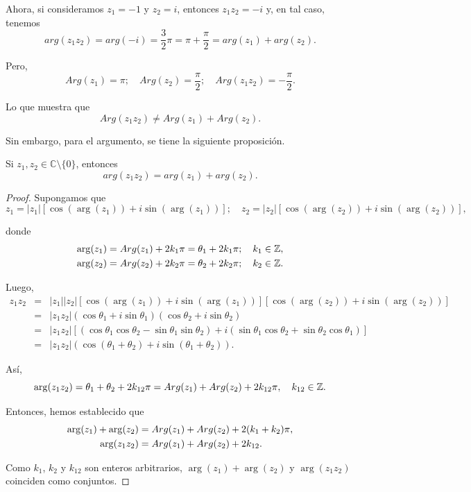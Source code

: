 Ahora, si consideramos $z_1 = -1$ y $z_2 = i$, entonces $z_1 z_2 = -i$ y, en tal caso, tenemos
$$arg(z_1 z_2) = arg(-i) = \frac{3}{2}\pi = \pi + \frac{\pi}{2} = arg(z_1) + arg(z_2).$$

Pero,
$$Arg(z_1) = \pi; \quad Arg(z_2) = \frac{\pi}{2};\quad Arg(z_1z_2) = - \frac{\pi}{2}.$$

Lo que muestra que 
$$Arg(z_1z_2) \neq Arg(z_1) + Arg(z_2).$$

Sin embargo, para el argumento, se tiene la siguiente proposición.

\begin{propo}
Si $z_1, z_2 \in \mathbb{C}\setminus \{0\}$, entonces
\begin{equation}
arg(z_1z_2) = arg(z_1) + arg(z_2).\label{Producto.arg}
\end{equation}
\end{propo}

\begin{proof}
Supongamos que
\begin{equation}
z_1 = |z_1| [\cos ( \arg(z_1)) + i \sin( \arg(z_1))]; \quad z_2 = |z_2| [\cos( \arg(z_2)) + i \sin ( \arg(z_2))], \label{DosComplejos}
\end{equation}

donde 
\begin{align*}
    \arg(z_1) = Arg(z_1) + 2 k_1 \pi = \theta_1 + 2 k_1 \pi  ; \quad k_1 \in \mathbb{Z}, \\
     \arg(z_2) = Arg(z_2) + 2 k_2 \pi= \theta_2 + 2 k_2 \pi ; \quad k_2 \in \mathbb{Z}.
\end{align*}

Luego,
\begin{eqnarray*}
z_1 z_2 &=& |z_1| |z_2| [\cos ( \arg(z_1)) + i \sin( \arg(z_1))][\cos ( \arg(z_2)) + i \sin( \arg(z_2))] \\
&=& |z_1 z_2| (\cos \theta_1 + i \sin\theta_1)(\cos \theta_2 + i \sin \theta_2) \\
&=& |z_1 z_2| [(\cos \theta_1 \cos \theta_2 - \sin \theta_1 \sin\theta_2) + i(\sin\theta_1 \cos\theta_2 + \sin\theta_2 \cos \theta_1) ] \\
&=& |z_1 z_2| (\cos(\theta_1 + \theta_2) + i \sin(\theta_1 +  \theta_2)).
\end{eqnarray*}

Así,
$$\arg(z_1 z_2) = \theta_ 1 + \theta_2 + 2k_{12} \pi = Arg(z_1) + Arg(z_2) + 2k_{12} \pi, \quad k_{12} \in \mathbb{Z}.$$

Entonces, hemos establecido que 
\begin{align*}
    \arg(z_1) + \arg(z_2) &= Arg(z_1) + Arg(z_2) + 2 (k_1 + k_2)\pi, \\
    \arg(z_1 z_2) &= Arg(z_1) + Arg(z_2) + 2 k_{12}.
\end{align*}

Como $k_1$, $k_2$ y $k_{12}$ son enteros arbitrarios, $ \arg(z_1) + \arg(z_2)$ y $ \arg(z_1 z_2)$ coinciden como conjuntos.
\end{proof}

